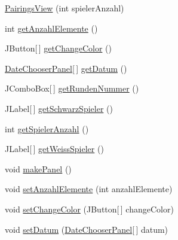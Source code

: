 \begin{DoxyCompactItemize}
\item 
\hyperlink{classde_1_1turnierverwaltung_1_1view_1_1_pairings_view_a5a87291eb65cbdabe286edcb67670050}{Pairings\+View} (int spieler\+Anzahl)
\item 
int \hyperlink{classde_1_1turnierverwaltung_1_1view_1_1_pairings_view_a15eac64345827aa2569ca594f9033499}{get\+Anzahl\+Elemente} ()
\item 
J\+Button\mbox{[}$\,$\mbox{]} \hyperlink{classde_1_1turnierverwaltung_1_1view_1_1_pairings_view_a55de391c701f914f0f4a423e6177a928}{get\+Change\+Color} ()
\item 
\hyperlink{classde_1_1turnierverwaltung_1_1view_1_1_date_chooser_panel}{Date\+Chooser\+Panel}\mbox{[}$\,$\mbox{]} \hyperlink{classde_1_1turnierverwaltung_1_1view_1_1_pairings_view_ab7906c3459a3fb60fa671071bdd086eb}{get\+Datum} ()
\item 
J\+Combo\+Box\mbox{[}$\,$\mbox{]} \hyperlink{classde_1_1turnierverwaltung_1_1view_1_1_pairings_view_a99f919a45462bc7e31c728e71bd04474}{get\+Runden\+Nummer} ()
\item 
J\+Label\mbox{[}$\,$\mbox{]} \hyperlink{classde_1_1turnierverwaltung_1_1view_1_1_pairings_view_ac46c85c8dbb5fd2a00c948feb3c66018}{get\+Schwarz\+Spieler} ()
\item 
int \hyperlink{classde_1_1turnierverwaltung_1_1view_1_1_pairings_view_a9857b839a2735ec946452b45c1e06f9e}{get\+Spieler\+Anzahl} ()
\item 
J\+Label\mbox{[}$\,$\mbox{]} \hyperlink{classde_1_1turnierverwaltung_1_1view_1_1_pairings_view_a25ccfa18aaee813593f4e15b5d4a3e9f}{get\+Weiss\+Spieler} ()
\item 
void \hyperlink{classde_1_1turnierverwaltung_1_1view_1_1_pairings_view_a08f1e527d51a0dfc366fedd4506b795d}{make\+Panel} ()
\item 
void \hyperlink{classde_1_1turnierverwaltung_1_1view_1_1_pairings_view_aceb0d6deee1fbd83b60430d804dc8776}{set\+Anzahl\+Elemente} (int anzahl\+Elemente)
\item 
void \hyperlink{classde_1_1turnierverwaltung_1_1view_1_1_pairings_view_a15f250a8a7e732c7c56d1be1bc8d86d2}{set\+Change\+Color} (J\+Button\mbox{[}$\,$\mbox{]} change\+Color)
\item 
void \hyperlink{classde_1_1turnierverwaltung_1_1view_1_1_pairings_view_a16fd6f008c965008ce3785b908528569}{set\+Datum} (\hyperlink{classde_1_1turnierverwaltung_1_1view_1_1_date_chooser_panel}{Date\+Chooser\+Panel}\mbox{[}$\,$\mbox{]} datum)
\item 

\end{DoxyCompactItemize}
